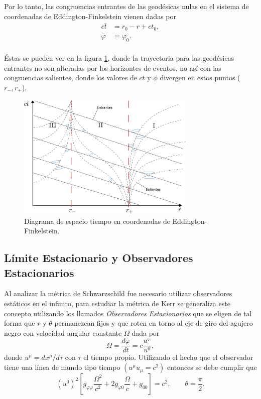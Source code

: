 Por lo tanto, las congruencias entrantes de las geod\'esicas nulas  en el sistema de coordenadas de Eddington-Finkelstein vienen dadas por
\begin{equation}
\begin{aligned}
c\bar{t}&=r_0-r+ct_0,\\
\bar{\varphi}&=\varphi_0.\\
\end{aligned}
\end{equation}

\'Estas se pueden ver en la figura \ref{fig:conos2}, donde la trayectoria para las geod\'esicas entrantes no son alteradas por los horizontes de eventos, no as\'i con las congruencias salientes, donde los valores de $ct$ y $\phi$ divergen en estos puntos ($r_-,r_+$).\\
\begin{figure}[H]
 \centering
\includegraphics[height=6cm,angle=0]{fig/fig-conos2.pdf}
\caption{Diagrama de espacio tiempo en coordenadas de Eddington-Finkelstein.}
\label{fig:conos2}
\end{figure}

\subsection{L\'imite Estacionario y Observadores Estacionarios}

Al analizar la m\'etrica de Schwarzschild fue necesario utilizar observadores est\'aticos en el infinito, para estudiar la m\'etrica de Kerr se generaliza este concepto utilizando los llamados \textit{Observadores Estacionarios} que se eligen de tal forma que $r$ y $\theta$ permanezcan fijos
y que roten en torno al eje de giro del agujero negro con velocidad angular constante $\Omega$ dada por
\begin{equation}
\Omega=\frac{d\varphi}{dt}=c\frac{u^{\varphi}}{u^{0}},
\end{equation}
donde $u^{\mu}=dx^{\mu}/d\tau$ con $\tau$ el tiempo propio. Utilizando el hecho que el observador tiene una l\'inea de mundo tipo tiempo $(u^{\mu}u_{\mu}=c^2)$ entonces se debe cumplir que
\begin{equation}\label{cuadrados}
\left(u^{0}\right)^2\left[g_{\varphi \varphi}\frac{\Omega^2}{c^2}+2g_{\varphi 0}\frac{\Omega}{c} +g_{00}\right]=c^2, \qquad \theta=\frac{\pi}{2}.
\end{equation}

